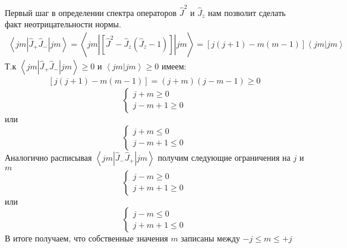 \documentclass[__main__.tex]{subfiles}
\begin{document}
Первый шаг в определении спектра операторов $\hat{J}^2$ и $\hat{J}_z$ нам позволит сделать факт неотрицательности нормы.
\begin{gather*}
    \left<jm|\hat{J}_{+}\hat{J}_{-}|jm\right> = \left<jm\left|\left[\hat{J}^2-\hat{J}_z\left(\hat{J}_z-1\right)\right]\right|jm\right> = \left[j(j+1)-m(m-1)\right]\left<jm|jm\right>
\end{gather*}
Т.к $\left<jm|\hat{J}_{+}\hat{J}_{-}|jm\right> \geq 0$ и $\left<jm|jm\right> \geq 0$ имеем:
\begin{gather*}
    \left[j(j+1)-m(m-1)\right] = (j+m)(j-m-1) \geq 0
\end{gather*}
\begin{equation*}
    \begin{cases}
        j+m \geq 0 \\
        j-m+1 \geq 0
    \end{cases}
\end{equation*}
или
\begin{equation*}
    \begin{cases}
        j+m \leq 0 \\
        j-m+1 \leq 0
    \end{cases}
\end{equation*}
Аналогично расписывая $   \left<jm|\hat{J}_{-}\hat{J}_{+}|jm\right>$ получим следующие ограничения на $j$ и $m$
\begin{equation*}
    \begin{cases}
        j-m \geq 0 \\
        j+m+1 \geq 0
    \end{cases}
\end{equation*}
или
\begin{equation*}
    \begin{cases}
        j-m \leq 0 \\
        j+m+1 \leq 0
    \end{cases}
\end{equation*}
В итоге получаем, что собственные значения $m$ записаны между $-j\leq m \leq +j$
\end{document}
